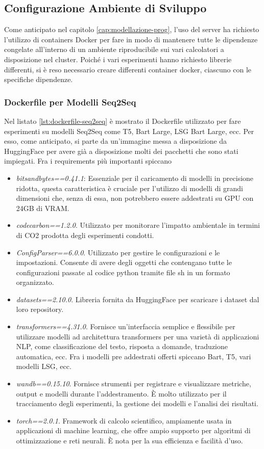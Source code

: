 \documentclass[12pt,a4paper,twoside,openright]{book}
\begin{document}
\subsection{Configurazione Ambiente di Sviluppo}
Come anticipato nel capitolo \ref{cap:modellazione-prog}, l'uso del server ha richiesto l'utilizzo di containers Docker per fare in modo di mantenere tutte le dipendenze congelate all'interno di un ambiente riproducibile sui vari calcolatori a disposizione nel cluster.
Poiché i vari esperimenti hanno richiesto librerie differenti, si è reso necessario creare differenti container docker, ciascuno con le specifiche dipendenze.


\subsubsection{Dockerfile per Modelli Seq2Seq}
Nel listato \ref{lst:dockerfile-seq2seq} è mostrato il Dockerfile utilizzato per fare esperimenti su modelli Seq2Seq come T5, Bart Large, LSG Bart Large, ecc. Per esso, come anticipato, si parte da un'immagine messa a disposizione da HuggingFace per avere già a disposizione molti dei pacchetti che sono stati impiegati. Fra i requirements più importanti spiccano
\begin{itemize}
    \item \emph{bitsandbytes==0.41.1}: Essenziale per il caricamento di modelli in precisione ridotta, questa caratteristica è cruciale per l'utilizzo di modelli di grandi dimensioni che, senza di essa, non potrebbero essere addestrati su GPU con 24GB di VRAM.
    \item \emph{codecarbon==1.2.0}. Utilizzato per monitorare l'impatto ambientale in termini di CO2 prodotta degli esperimenti condotti.
    \item \emph{ConfigParser==6.0.0}. Utilizzato per gestire le configurazioni e le impostazioni. Consente di avere degli oggetti che contengano tutte le configurazioni passate al codice python tramite file sh in un formato organizzato.
    \item \emph{datasets==2.10.0}. Libreria fornita da HuggingFace per scaricare i dataset dal loro repository.
    \item \emph{transformers==4.31.0}. Fornisce un'interfaccia semplice e flessibile per utilizzare modelli ad architettura transformers per una varietà di applicazioni NLP, come classificazione del testo, risposta a domande, traduzione automatica, ecc. Fra i modelli pre addestrati offerti spiccano Bart, T5, vari modelli LSG, ecc.
    \item \emph{wandb==0.15.10}. Fornisce strumenti per registrare e visualizzare metriche, output e modelli durante l'addestramento. È molto utilizzato per il tracciamento degli esperimenti, la gestione dei modelli e l'analisi dei risultati.
    \item \emph{torch==2.0.1}. Framework di calcolo scientifico, ampiamente usata in applicazioni di machine learning, che offre ampio supporto per algoritmi di ottimizzazione e reti neurali. È nota per la sua efficienza e facilità d'uso.
\end{itemize}
\end{document}
